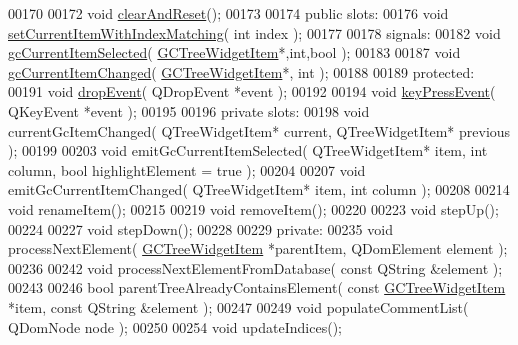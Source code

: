 \begin{DoxyCode}
00170 
00172   \textcolor{keywordtype}{void} \hyperlink{class_g_c_dom_tree_widget_a3716c84a2a4fadc653cfac157caa215d}{clearAndReset}();
00173 
00174 \textcolor{keyword}{public} slots:
00176   \textcolor{keywordtype}{void} \hyperlink{class_g_c_dom_tree_widget_ab9178aca10757ba7b7cef489171fb725}{setCurrentItemWithIndexMatching}( \textcolor{keywordtype}{int} index );
00177 
00178 signals:
00182   \textcolor{keywordtype}{void} \hyperlink{class_g_c_dom_tree_widget_aa4aaa06b56ebf5500fd41253144bd6fd}{gcCurrentItemSelected}( \hyperlink{class_g_c_tree_widget_item}{GCTreeWidgetItem}*,\textcolor{keywordtype}{int},\textcolor{keywordtype}{bool} );
00183 
00187   \textcolor{keywordtype}{void} \hyperlink{class_g_c_dom_tree_widget_a20238112d91ad7a05e9a762ce2a51589}{gcCurrentItemChanged}( \hyperlink{class_g_c_tree_widget_item}{GCTreeWidgetItem}*, \textcolor{keywordtype}{int} );
00188 
00189 \textcolor{keyword}{protected}:
00191   \textcolor{keywordtype}{void} \hyperlink{class_g_c_dom_tree_widget_ac4ccf569a0c538e3c1c72e887f78f5b6}{dropEvent}( QDropEvent *event );
00192 
00194   \textcolor{keywordtype}{void} \hyperlink{class_g_c_dom_tree_widget_ae79022f5265210c71c2a80eb662e3a81}{keyPressEvent}( QKeyEvent *event );
00195 
00196 \textcolor{keyword}{private} slots:
00198   \textcolor{keywordtype}{void} currentGcItemChanged( QTreeWidgetItem* current, QTreeWidgetItem* 
      previous );
00199 
00203   \textcolor{keywordtype}{void} emitGcCurrentItemSelected( QTreeWidgetItem* item, \textcolor{keywordtype}{int} column, \textcolor{keywordtype}{bool} 
      highlightElement = \textcolor{keyword}{true} );
00204 
00207   \textcolor{keywordtype}{void} emitGcCurrentItemChanged( QTreeWidgetItem* item, \textcolor{keywordtype}{int} column );
00208 
00214   \textcolor{keywordtype}{void} renameItem();
00215 
00219   \textcolor{keywordtype}{void} removeItem();
00220 
00223   \textcolor{keywordtype}{void} stepUp();
00224 
00227   \textcolor{keywordtype}{void} stepDown();
00228 
00229 \textcolor{keyword}{private}:
00235   \textcolor{keywordtype}{void} processNextElement( \hyperlink{class_g_c_tree_widget_item}{GCTreeWidgetItem} *parentItem, QDomElement element );
00236 
00242   \textcolor{keywordtype}{void} processNextElementFromDatabase( \textcolor{keyword}{const} QString &element );
00243 
00246   \textcolor{keywordtype}{bool} parentTreeAlreadyContainsElement( \textcolor{keyword}{const} \hyperlink{class_g_c_tree_widget_item}{GCTreeWidgetItem} *item, \textcolor{keyword}{const} 
      QString &element );
00247 
00249   \textcolor{keywordtype}{void} populateCommentList( QDomNode node );
00250 
00254   \textcolor{keywordtype}{void} updateIndices();

\end{DoxyCode}
